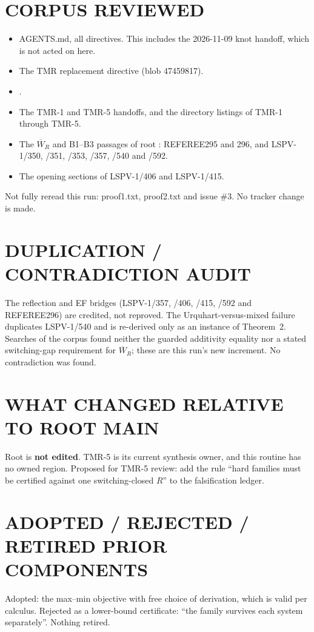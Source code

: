 \documentclass[11pt]{article}
\begin{document}
\section{CORPUS REVIEWED}
\begin{itemize}
\item AGENTS.md, all directives. This includes the 2026-11-09 knot handoff, which is not acted on here.
\item The TMR replacement directive  (blob 47459817).
\item {}.
\item The TMR-1 and TMR-5 handoffs, and the directory listings of TMR-1 through TMR-5.
\item The $\overline W_R$ and B1--B3 passages of root : REFEREE295 and 296, and LSPV-1/350, /351, /353, /357, /540 and /592.
\item The opening sections of LSPV-1/406 and LSPV-1/415.
\end{itemize}
Not fully reread this run: proof1.txt, proof2.txt and issue \#3. No tracker change is made.

\section{DUPLICATION / CONTRADICTION AUDIT}
The reflection and EF bridges (LSPV-1/357, /406, /415, /592 and REFEREE296) are credited, not reproved. The Urquhart-versus-mixed failure duplicates LSPV-1/540 and is re-derived only as an instance of Theorem~2. Searches of the corpus found neither the guarded additivity equality nor a stated switching-gap requirement for $\overline W_R$; these are this run's new increment. No contradiction was found.

\section{WHAT CHANGED RELATIVE TO ROOT MAIN}
Root  is \textbf{not edited}. TMR-5 is its current synthesis owner, and this routine has no owned region. Proposed for TMR-5 review: add the rule ``hard families must be certified against one switching-closed $R$'' to the falsification ledger.

\section{ADOPTED / REJECTED / RETIRED PRIOR COMPONENTS}
Adopted: the max--min objective with free choice of derivation, which is valid per calculus. Rejected as a lower-bound certificate: ``the family survives each system separately''. Nothing retired.
\end{document}
